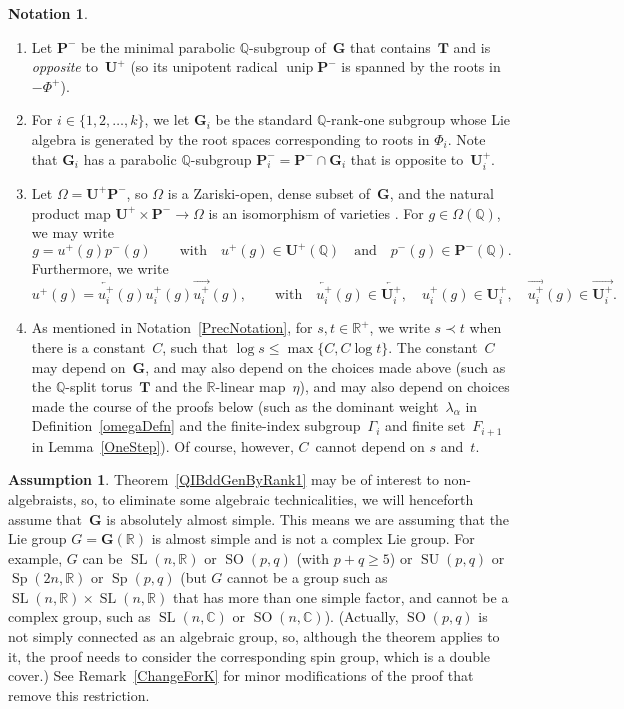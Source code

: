 \documentclass[11pt]{article}
\numberwithin{equation}{section}
\newcommand{\CC}{\mathbb{C}}
\newcommand{\QQ}{\mathbb{Q}}
\newcommand{\RR}{\mathbb{R}}
\newcommand{\Ga}{\mathbf{G}}
\newcommand{\Pa}{\mathbf{P}}
\newcommand{\Ta}{\mathbf{T}}
\newcommand{\Ua}{\mathbf{U}}
\DeclareMathOperator{\SO}{SO}
\DeclareMathOperator{\Sp}{Sp}
\DeclareMathOperator{\SL}{SL}
\DeclareMathOperator{\SU}{SU}
\DeclareMathOperator{\unip}{unip}
\newcommand{\ra}{\overrightarrow}
\newcommand{\la}{\overleftarrow}
\numberwithin{equation}{section}
\theoremstyle{definition}
\newtheorem{assumption}[thm]{Assumption}
\newtheorem{notation}[thm]{Notation}
\begin{document}
\begin{notation}
\begin{enumerate}
\item Let $\Pa^-$ be the minimal parabolic $\QQ$-subgroup of~$\Ga$ that contains~$\Ta$ and is \emph{opposite} to~$\Ua^+$ (so its unipotent radical $\unip \Pa^-$ is spanned by the roots in $-\Phi^+$).

\item For $i \in \{1,2,\ldots,k\}$, we let $\Ga_i$ be the standard $\QQ$-rank-one subgroup whose Lie algebra is generated by the root spaces corresponding to roots in $\Phi_i$. Note that $\Ga_i$ has a parabolic $\QQ$-subgroup $\Pa_i^- = \Pa^- \cap \Ga_i$ that is opposite to~$\Ua_i^+$.

\item Let $\Omega = \Ua^+ \Pa^-$, so $\Omega$ is a Zariski-open, dense subset of~$\Ga$, and the natural product map $\Ua^+ \times \Pa^- \to \Omega$ is an isomorphism of varieties \cite[Proposition~4.10(d), pp.~88--89]{BorelTits-GrpRed}. For $g \in \Omega(\QQ)$, we may write
		\[ g = u^+(g) p^-(g) \qquad \text{with} \quad u^+(g) \in \Ua^+(\QQ) \quad \text{and} \quad p^-(g) \in \Pa^-(\QQ) . \]
Furthermore, we write
	\[ u^+(g) = \la{u^+_i}(g) u^+_i(g) \ra{u^+_i}(g) , \qquad \text{with} \quad \la{u^+_i}(g) \in \la{\Ua_i^+}, \quad u^+_i(g) \in \Ua_i^+, \quad \ra{u^+_i}(g) \in \ra{\Ua_i^+} .\]
	
	\item As mentioned in Notation~\ref{PrecNotation}, for $s,t \in \RR^+$, we write $s \prec t$ when there is a constant~$C$, such that $\log s \le \max\{C, C \log t\}$. The constant~$C$ may depend on~$\Ga$, and may also depend on the choices made above (such as the $\QQ$-split torus~$\Ta$ and the $\RR$-linear map~$\eta$), and may also depend on choices made the course of the proofs below (such as the dominant weight~$\lambda_\alpha$ in Definition~\ref{omegaDefn} and the finite-index subgroup~$\Gamma_i$ and finite set~$F_{i+1}$ in Lemma~\ref{OneStep}). Of course, however, $C$~cannot depend on $s$ and~$t$.
\end{enumerate}
\end{notation}

\begin{assumption} \label{AbsSimple}Theorem~\ref{QIBddGenByRank1} may be of interest to non-algebraists, so, to eliminate some algebraic technicalities, we will henceforth assume that~$\Ga$ is absolutely almost simple. This means we are assuming that the Lie group $G = \Ga(\RR)$ is almost simple and is not a complex Lie group. For example, $G$ can be $\SL(n,\RR)$ or $\SO(p,q)$ (with $p + q \ge 5$) or $\SU(p,q)$ or $\Sp(2n,\RR)$ or $\Sp(p,q)$ (but $G$ cannot be a group such as $\SL(n,\RR) \times \SL(n,\RR)$ that has more than one simple factor, and cannot be a complex group, such as $\SL(n,\CC)$ or $\SO(n,\CC)$).
(Actually, $\SO(p,q)$ is not simply connected as an algebraic group, so, although the theorem applies to it, the proof needs to consider the corresponding spin group, which is a double cover.)
See Remark~\ref{ChangeForK} for minor modifications of the proof that remove this restriction.
\end{assumption}
\end{document}
